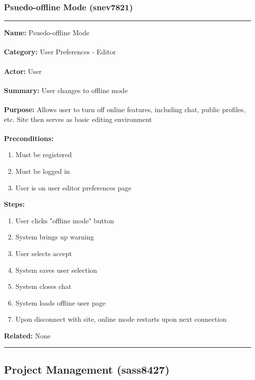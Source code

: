 \documentclass[11pt]{report}
\begin{document}
\subsubsection{Psuedo-offline Mode (snev7821)}
\vspace{2pt}
\hrule
\vspace{8pt}
	\noindent\textbf{Name:} Psuedo-offline Mode \\ \\
	\textbf{Category:} User Preferences - Editor  \\ \\
	\textbf{Actor:} User \\ \\
	\textbf{Summary:} User changes to offline mode \\ \\
	\textbf{Purpose:} Allows user to turn off online features, including chat, public profiles, etc. Site then serves as basic editing environment\\ \\
	\textbf{Preconditions:} 
	\begin{enumerate}
		\item Must be registered
		\item Must be logged in
		\item User is on user editor preferences page
	\end{enumerate}
	\textbf{Steps:}
	\begin{enumerate}
		\item User clicks "offline mode" button
		\item System brings up warning
		\item User selects accept
		\item System saves user selection
		\item System closes chat
		\item System loads offline user page
		\item Upon disconnect with site, online mode restarts upon next connection
	\end{enumerate}
	\textbf{Related:} None 
\vspace{8pt}
\hrule
\newpage

\subsection{Project Management (sass8427)}
\end{document}

